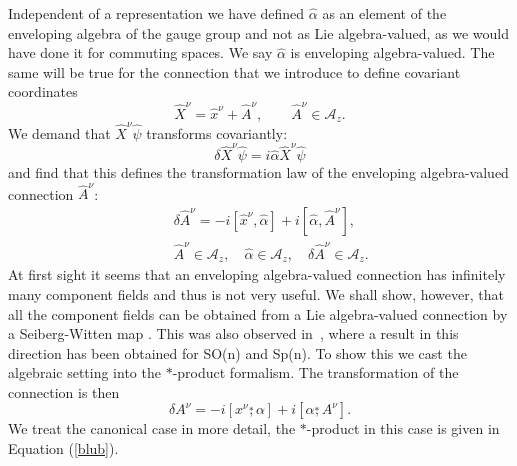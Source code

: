\documentclass[a4paper,11pt]{article}
\def\nn{\nonumber }
\def\Az{{\mathcal{A}_z}}
\def\ds{\stackrel{*}{,}}
\def\x{\hat x}
\def\xx{{\hat X}}
\def\aa{{\hat A}}
\begin{document}
Independent of a representation we have defined $\hat{\alpha}$
as an element of the enveloping algebra of the gauge group
and not as Lie algebra-valued, as we would have done it for
commuting spaces. We say $\hat{\alpha}$ is enveloping algebra-valued.
The same will be true for the connection that we introduce to
define covariant coordinates \cite{MSSW}
\begin{equation}
  \xx^{\nu}=\x^{\nu}+\aa^{\nu},\qquad \aa^{\nu}\in \Az.
\end{equation}
We demand that $\hat{X}^{\nu}\hat{\psi}$ transforms covariantly:
\begin{equation}
  \delta\xx^{\nu}\hat{\psi}=i\hat{\alpha}\xx^{\nu}\hat{\psi}
\end{equation}
and find that this defines the transformation law of the 
enveloping algebra-valued connection $\aa^{\nu}$:
\begin{eqnarray}
  &&\delta\aa^{\nu}=-i[\x^{\nu},\hat{\alpha}]+i[\hat{\alpha},\aa^{\nu}],\nn\\
  &&\aa^{\nu}\in\Az,\quad \hat{\alpha}\in\Az,\quad \delta\hat{A}^{\nu}\in\Az.
\end{eqnarray}
At first sight it seems that an enveloping algebra-valued 
connection has infinitely many component fields and thus is
not very useful. We shall show, however, that all the 
component fields can be obtained from a Lie algebra-valued
connection by a Seiberg-Witten map \cite{SW,JS,JSW2}. This was also
observed in~\cite{Bonora}, where a result in this direction has been obtained
for SO(n) and Sp(n).  To show this
we cast the algebraic setting into the $*$-product formalism.
The transformation of the connection is then
\begin{equation}
  \delta A^{\nu}=-i[x^{\nu}\ds{\alpha}]+i[{\alpha}\ds A^{\nu}].
\end{equation}
We treat the canonical case in more detail, the $*$-product
in this case is given in Equation (\ref{blub}).
\end{document}
